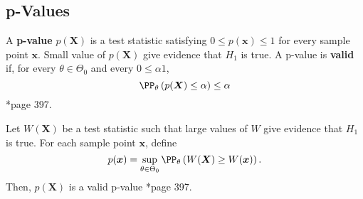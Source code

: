 \subsection*{p-Values}

\begin{defe}[p-Values] \label{defe: p_val}
    A {\bf p-value} $p(\bm{X})$ is a test statistic satisfying $0 \leq p(\bm{x})\leq 1$ for every sample point $\bm{x}$. Small value of $p(\bm{X})$ give evidence that $H_1$ is true. A p-value is {\bf valid} if, for every $\theta \in \Theta_0$ and every $0 \leq \alpha 1$,
    \begin{equation*}
        \PP_{\theta} \left( p(\bm{X}) \leq \alpha \right) \leq \alpha
    \end{equation*}
    \cite{CasellaGeorge2001SI}*{page 397}.
\end{defe}

\begin{thm}
    Let $W(\bm{X})$ be a test statistic such that large values of $W$ give evidence that $H_1$ is true. For each sample point $\bm{x}$, define
    \begin{equation*}
        p(\bm{x}) = \sup_{\theta \in \Theta_0} \PP_{\theta} \left( W(\bm{X}) \geq W(\bm{x}) \right).
    \end{equation*}
    Then, $p(\bm{X})$ is a valid p-value \cite{CasellaGeorge2001SI}*{page 397}.
\end{thm}